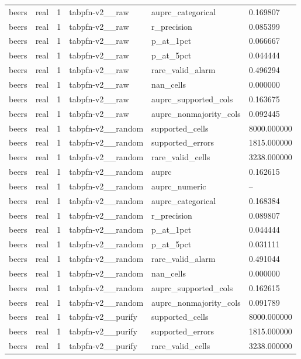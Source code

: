 \begin{tabular}{llllll}
beers & real & 1 & tabpfn-v2\_\_raw & auprc\_categorical & 0.169807 \\
beers & real & 1 & tabpfn-v2\_\_raw & r\_precision & 0.085399 \\
beers & real & 1 & tabpfn-v2\_\_raw & p\_at\_1pct & 0.066667 \\
beers & real & 1 & tabpfn-v2\_\_raw & p\_at\_5pct & 0.044444 \\
beers & real & 1 & tabpfn-v2\_\_raw & rare\_valid\_alarm & 0.496294 \\
beers & real & 1 & tabpfn-v2\_\_raw & nan\_cells & 0.000000 \\
beers & real & 1 & tabpfn-v2\_\_raw & auprc\_supported\_cols & 0.163675 \\
beers & real & 1 & tabpfn-v2\_\_raw & auprc\_nonmajority\_cols & 0.092445 \\
beers & real & 1 & tabpfn-v2\_\_random & supported\_cells & 8000.000000 \\
beers & real & 1 & tabpfn-v2\_\_random & supported\_errors & 1815.000000 \\
beers & real & 1 & tabpfn-v2\_\_random & rare\_valid\_cells & 3238.000000 \\
beers & real & 1 & tabpfn-v2\_\_random & auprc & 0.162615 \\
beers & real & 1 & tabpfn-v2\_\_random & auprc\_numeric & -- \\
beers & real & 1 & tabpfn-v2\_\_random & auprc\_categorical & 0.168384 \\
beers & real & 1 & tabpfn-v2\_\_random & r\_precision & 0.089807 \\
beers & real & 1 & tabpfn-v2\_\_random & p\_at\_1pct & 0.044444 \\
beers & real & 1 & tabpfn-v2\_\_random & p\_at\_5pct & 0.031111 \\
beers & real & 1 & tabpfn-v2\_\_random & rare\_valid\_alarm & 0.491044 \\
beers & real & 1 & tabpfn-v2\_\_random & nan\_cells & 0.000000 \\
beers & real & 1 & tabpfn-v2\_\_random & auprc\_supported\_cols & 0.162615 \\
beers & real & 1 & tabpfn-v2\_\_random & auprc\_nonmajority\_cols & 0.091789 \\
beers & real & 1 & tabpfn-v2\_\_purify & supported\_cells & 8000.000000 \\
beers & real & 1 & tabpfn-v2\_\_purify & supported\_errors & 1815.000000 \\
beers & real & 1 & tabpfn-v2\_\_purify & rare\_valid\_cells & 3238.000000 \\

\end{tabular}
